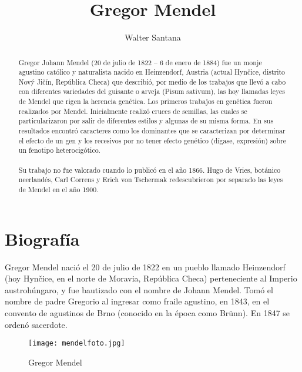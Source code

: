 \documentclass[letterpaper,11pt]{report}
\title{Gregor Mendel}
\author{Walter Santana}
\begin{document}
\maketitle






\begin{abstract}
Gregor Johann Mendel (20 de julio de 1822 – 6 de enero de 1884) fue un monje agustino católico y naturalista nacido en Heinzendorf, Austria (actual Hynčice, distrito Nový Jičín, República Checa) que describió, por medio de los trabajos que llevó a cabo con diferentes variedades del guisante o arveja (Pisum sativum), las hoy llamadas leyes de Mendel que rigen la herencia genética. Los primeros trabajos en genética fueron realizados por Mendel. Inicialmente realizó cruces de semillas, las cuales se particularizaron por salir de diferentes estilos y algunas de su misma forma. En sus resultados encontró caracteres como los dominantes que se caracterizan por determinar el efecto de un gen y los recesivos por no tener efecto genético (dígase, expresión) sobre un fenotipo heterocigótico. \\ \\
Su trabajo no fue valorado cuando lo publicó en el año 1866. Hugo de Vries, botánico neerlandés, Carl Correns y Erich von Tschermak redescubrieron por separado las leyes de Mendel en el año 1900.\cite{evolucion}

\end{abstract}
	


\tableofcontents
\newpage

\chapter{Biografía}

Gregor Mendel nació el 20 de julio de 1822 en un pueblo llamado Heinzendorf (hoy Hynčice, en el norte de Moravia, República Checa) perteneciente al Imperio austrohúngaro, y fue bautizado con el nombre de Johann Mendel. Tomó el nombre de padre Gregorio al ingresar como fraile agustino, en 1843, en el convento de agustinos de Brno (conocido en la época como Brünn). En 1847 se ordenó sacerdote.

\begin{figure}[h!]
\centering
\texttt{[image: mendelfoto.jpg]}
\caption{Gregor Mendel}\label{cap1f1}
\end{figure}
\end{document}
